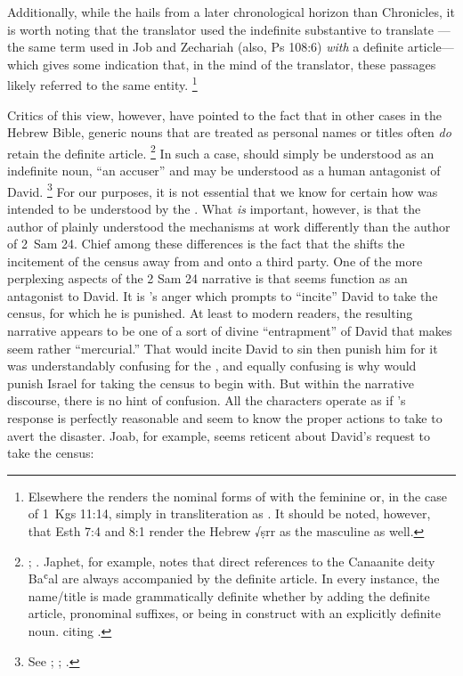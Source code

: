 Additionally, while the \lxx hails from a later chronological horizon than Chronicles, it is worth noting that the translator used the indefinite substantive  to translate ---the same term used in Job and Zechariah (also, Ps 108:6) \emph{with} a definite article---which gives some indication that, in the mind of the translator, these passages likely referred to the same entity.%
    \footnote{Elsewhere the \lxx renders the nominal forms of  with the feminine  or, in the case of 1~Kgs 11:14, simply in transliteration as . It should be noted, however, that Esth 7:4 and 8:1 render the Hebrew √ṣrr as the masculine  as well.} 

 Critics of this view, however, have pointed to the fact that in other cases in the Hebrew Bible, generic nouns that are treated as personal names or titles often \emph{do} retain the definite article.%
    \footnote{\cite[114--117]{japhet2009};
        \cite[370--390]{japhet1993}. Japhet, for example, notes that direct references to the Canaanite deity Baʿal are always accompanied by the definite article. In every instance, the name/title  is made grammatically definite whether by adding the definite article, pronominal suffixes, or being in construct with an explicitly definite noun. 
        \cite[115]{japhet2009} citing 
        \cite[§126d]{gkc}.}
In such a case,  should simply be understood as an indefinite noun, ``an accuser'' and may be understood as a human antagonist of David.%
    \footnote{See 
        \cite{stokes_jbl2009};
        \cite[114--117]{japhet2009}; 
        \cite[370--390]{japhet1993}.} 
For our purposes, it is not essential that we know for certain how  was intended to be understood by the \chronicler. What \emph{is} important, however, is that the author of \chronicles plainly understood the mechanisms at work differently than the author of 2~Sam 24. Chief among these differences is the fact that the \chronicler shifts the incitement of the census away from \yahweh and onto a third party. One of the more perplexing aspects of the 2 Sam 24 narrative is that \yahweh seems function as an antagonist to David. It is \yahweh's anger which prompts \yahweh to ``incite'' David to take the census, for which he is punished. At least to modern readers, the resulting narrative appears to be one of a sort of divine ``entrapment'' of David that makes \yahweh seem rather ``mercurial.''%
    \autocite[4]{rollston_keith-stuckenbruck2016}
That \yahweh would incite David to sin then punish him for it was understandably confusing for the \chronicler, and equally confusing is why \yahweh would punish Israel for taking the census to begin with. But within the narrative discourse, there is no hint of confusion. All the characters operate as if \yahweh's response is perfectly reasonable and seem to know the proper actions to take to avert the disaster. Joab, for example, seems reticent about David's request to take the census:
